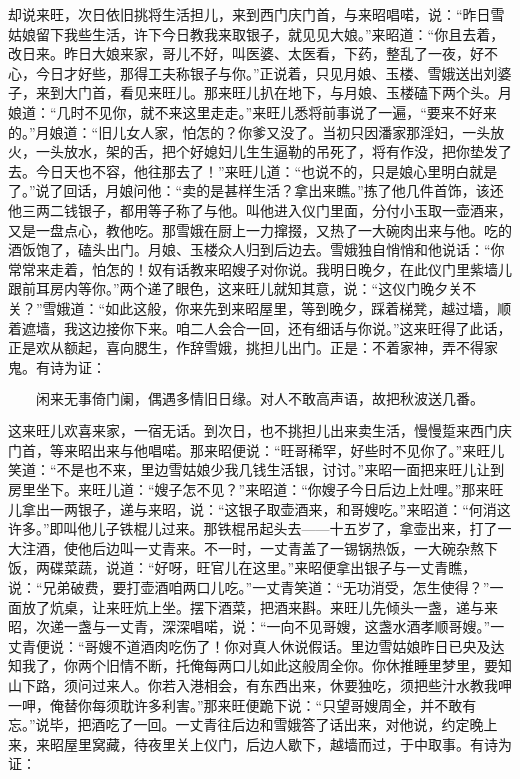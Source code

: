 却说来旺，次日依旧挑将生活担儿，来到西门庆门首，与来昭唱喏，说：“昨日雪姑娘留下我些生活，许下今日教我来取银子，就见见大娘。”来昭道：“你且去着，改日来。昨日大娘来家，哥儿不好，叫医婆、太医看，下药，整乱了一夜，好不心，今日才好些，那得工夫称银子与你。”正说着，只见月娘、玉楼、雪娥送出刘婆子，来到大门首，看见来旺儿。那来旺儿扒在地下，与月娘、玉楼磕下两个头。月娘道：“几时不见你，就不来这里走走。”来旺儿悉将前事说了一遍，“要来不好来的。”月娘道：“旧儿女人家，怕怎的？你爹又没了。当初只因潘家那淫妇，一头放火，一头放水，架的舌，把个好媳妇儿生生逼勒的吊死了，将有作没，把你垫发了去。今日天也不容，他往那去了！”来旺儿道：“也说不的，只是娘心里明白就是了。”说了回话，月娘问他：“卖的是甚样生活？拿出来瞧。”拣了他几件首饰，该还他三两二钱银子，都用等子称了与他。叫他进入仪门里面，分付小玉取一壶酒来，又是一盘点心，教他吃。那雪娥在厨上一力撺掇，又热了一大碗肉出来与他。吃的酒饭饱了，磕头出门。月娘、玉楼众人归到后边去。雪娥独自悄悄和他说话：“你常常来走着，怕怎的！奴有话教来昭嫂子对你说。我明日晚夕，在此仪门里紫墙儿跟前耳房内等你。”两个递了眼色，这来旺儿就知其意，说：“这仪门晚夕关不关？”雪娥道：“如此这般，你来先到来昭屋里，等到晚夕，踩着梯凳，越过墙，顺着遮墙，我这边接你下来。咱二人会合一回，还有细话与你说。”这来旺得了此话，正是欢从额起，喜向腮生，作辞雪娥，挑担儿出门。正是：不着家神，弄不得家鬼。有诗为证：

\[
闲来无事倚门阑，偶遇多情旧日缘。
对人不敢高声语，故把秋波送几番。
\]

这来旺儿欢喜来家，一宿无话。到次日，也不挑担儿出来卖生活，慢慢踅来西门庆门首，等来昭出来与他唱喏。那来昭便说：“旺哥稀罕，好些时不见你了。”来旺儿笑道：“不是也不来，里边雪姑娘少我几钱生活银，讨讨。”来昭一面把来旺儿让到房里坐下。来旺儿道：“嫂子怎不见？”来昭道：“你嫂子今日后边上灶哩。”那来旺儿拿出一两银子，递与来昭，说：“这银子取壶酒来，和哥嫂吃。”来昭道：“何消这许多。”即叫他儿子铁棍儿过来。那铁棍吊起头去——十五岁了，拿壶出来，打了一大注酒，使他后边叫一丈青来。不一时，一丈青盖了一锡锅热饭，一大碗杂熬下饭，两碟菜蔬，说道：“好呀，旺官儿在这里。”来昭便拿出银子与一丈青瞧，说：“兄弟破费，要打壶酒咱两口儿吃。”一丈青笑道：“无功消受，怎生使得？”一面放了炕桌，让来旺炕上坐。摆下酒菜，把酒来斟。来旺儿先倾头一盏，递与来昭，次递一盏与一丈青，深深唱喏，说：“一向不见哥嫂，这盏水酒孝顺哥嫂。”一丈青便说：“哥嫂不道酒肉吃伤了！你对真人休说假话。里边雪姑娘昨日已央及达知我了，你两个旧情不断，托俺每两口儿如此这般周全你。你休推睡里梦里，要知山下路，须问过来人。你若入港相会，有东西出来，休要独吃，须把些汁水教我呷一呷，俺替你每须耽许多利害。”那来旺便跪下说：“只望哥嫂周全，并不敢有忘。”说毕，把酒吃了一回。一丈青往后边和雪娥答了话出来，对他说，约定晚上来，来昭屋里窝藏，待夜里关上仪门，后边人歇下，越墙而过，于中取事。有诗为证：

